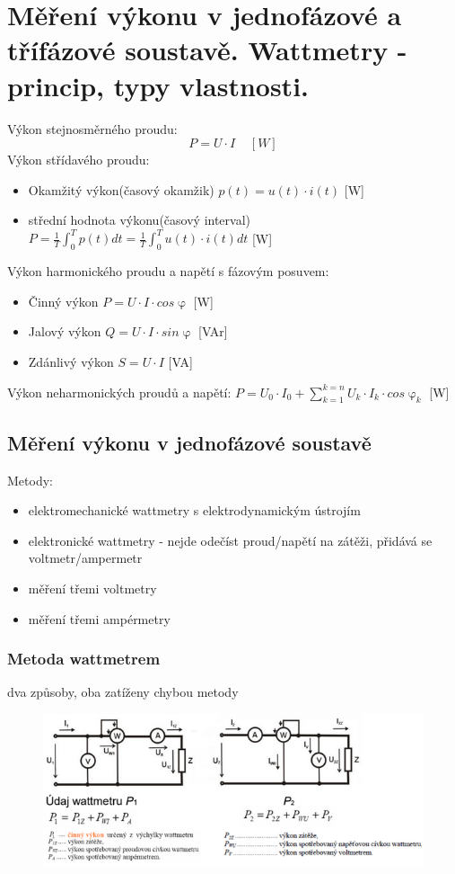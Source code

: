 \section{Měření výkonu v jednofázové a třífázové soustavě. Wattmetry - princip, typy vlastnosti.}
Výkon stejnosměrného proudu:
\begin{equation}
    P = U\cdot I \;\;\;\; [W]
\end{equation}
Výkon střídavého proudu:
\begin{itemize}
    \item Okamžitý výkon(časový okamžik) $p(t) = u(t)\cdot i(t)$   [W]
    \item střední hodnota výkonu(časový interval) $P = \frac{1}{T}\int_0^Tp(t)dt = \frac{1}{T}\int_0^Tu(t)\cdot i(t)dt$    [W]
\end{itemize}

Výkon harmonického proudu a napětí s fázovým posuvem:
\begin{itemize}
    \item Činný výkon    $P = U\cdot I \cdot cos \upvarphi $    [W]
    \item Jalový výkon   $Q = U\cdot I \cdot sin \upvarphi $    [VAr]
    \item Zdánlivý výkon  $S = U \cdot I$                     [VA]
\end{itemize}
Výkon neharmonických proudů a napětí: $P = U_0\cdot I_0 + \sum^{k=n}_{k=1}U_k\cdot I_k \cdot cos \upvarphi_k$     [W]
\subsection*{Měření výkonu v jednofázové soustavě}
Metody:
\begin{itemize}
    \item elektromechanické wattmetry s elektrodynamickým ústrojím
    \item elektronické wattmetry - nejde odečíst proud/napětí na zátěži, přidává se voltmetr/ampermetr
    \item měření třemi voltmetry
    \item měření třemi ampérmetry
\end{itemize}

\subsubsection*{Metoda wattmetrem}
dva způsoby, oba zatíženy chybou metody
\begin{figure}[H]
    \includegraphics*[scale = 1]{images/wattmetry2.png}
\end{figure}
\newpage

